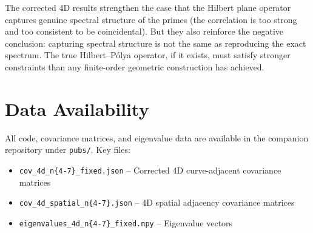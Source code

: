 \documentclass[11pt,a4paper]{article}
\begin{document}
The corrected 4D results strengthen the case that the Hilbert plane
operator captures genuine spectral structure of the primes (the
correlation is too strong and too consistent to be coincidental).  But
they also reinforce the negative conclusion: capturing spectral structure
is not the same as reproducing the exact spectrum.  The true
Hilbert--P\'{o}lya operator, if it exists, must satisfy stronger
constraints than any finite-order geometric construction has achieved.

\section*{Data Availability}

All code, covariance matrices, and eigenvalue data are available in the
companion repository under \texttt{pubs/}.  Key files:

\begin{itemize}
\item \texttt{cov\_4d\_n\{4-7\}\_fixed.json} -- Corrected 4D
   curve-adjacent covariance matrices
\item \texttt{cov\_4d\_spatial\_n\{4-7\}.json} -- 4D spatial adjacency
   covariance matrices
\item \texttt{eigenvalues\_4d\_n\{4-7\}\_fixed.npy} -- Eigenvalue vectors
\end{itemize}
\end{document}
